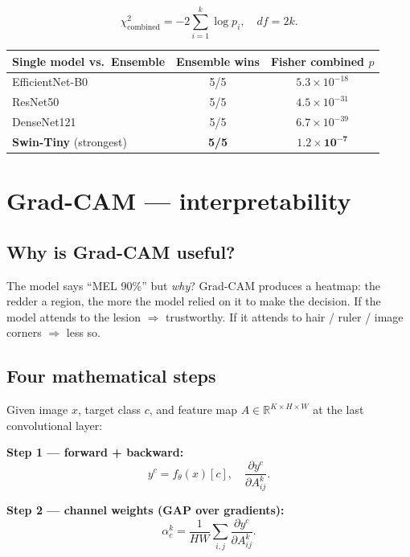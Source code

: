 \documentclass[11pt,a4paper]{article}
\begin{document}
\[
  \chi^2_{\text{combined}} = -2 \sum_{i=1}^k \log p_i, \quad df = 2k.
\]

\begin{table}[h]
\centering\small
\begin{tabular}{lcc}
\toprule
\textbf{Single model vs.\ Ensemble} & \textbf{Ensemble wins} & \textbf{Fisher combined $p$} \\
\midrule
EfficientNet-B0 & 5/5 & $5.3 \times 10^{-18}$ \\
ResNet50        & 5/5 & $4.5 \times 10^{-31}$ \\
DenseNet121     & 5/5 & $6.7 \times 10^{-39}$ \\
\textbf{Swin-Tiny} (strongest) & \textbf{5/5} & $\mathbf{1.2 \times 10^{-7}}$ \\
\bottomrule
\end{tabular}
\end{table}

\section{Grad-CAM --- interpretability}

\subsection{Why is Grad-CAM useful?}

\begin{simple}
The model says ``MEL 90\%'' but \textit{why}? Grad-CAM produces a heatmap: the redder a region, the more the model relied on it to make the decision. If the model attends to the lesion $\Rightarrow$ trustworthy. If it attends to hair / ruler / image corners $\Rightarrow$ less so.
\end{simple}

\subsection{Four mathematical steps}

Given image $x$, target class $c$, and feature map $A \in \mathbb{R}^{K \times H \times W}$ at the last convolutional layer:

\textbf{Step 1 --- forward + backward:}
\[
  y^c = f_\theta(x)[c], \quad \frac{\partial y^c}{\partial A^k_{ij}}.
\]

\textbf{Step 2 --- channel weights (GAP over gradients):}
\[
  \alpha_c^k = \frac{1}{HW} \sum_{i,j} \frac{\partial y^c}{\partial A^k_{ij}}.
\]
\end{document}
